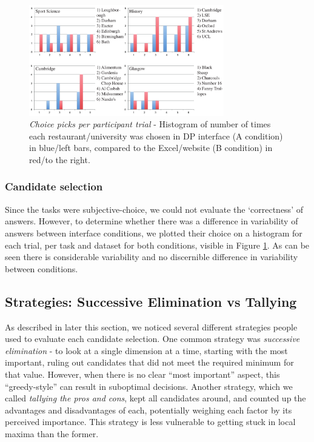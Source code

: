 \documentclass{sigchi}
\begin{document}
\begin{figure}[tbp]
\begin{center}
\includegraphics[width=8.5cm]{img/results}
\caption{\emph{Choice picks per participant trial} - Histogram of number of times each restaurant/university was chosen in DP interface (A condition) in blue/left bars, compared to the Excel/website (B condition) in red/to the right.}
\label{fig:chosen_results}
\end{center}
\end{figure}

\subsubsection{Candidate selection}
Since the tasks were subjective-choice, we could not evaluate the `correctness' of answers.  However, to determine whether there was a difference in variability of answers between interface conditions, we plotted their choice on a histogram for each trial, per task and dataset for both conditions, visible in Figure \ref{fig:chosen_results}.  As can be seen there is considerable variability and no discernible difference in variability between conditions.  

\subsection{Strategies: Successive Elimination vs Tallying}
As described in later this section, we noticed several different strategies people used to evaluate each candidate selection. One common strategy was \emph{successive elimination} - to look at a single dimension at a time, starting with the most important, ruling out candidates that did not meet the required minimum for that value.  However, when there is no clear ``most important'' aspect, this  ``greedy-style'' can result in suboptimal decisions.  Another strategy, which we called \emph{tallying the pros and cons}, kept all candidates around, and counted up the advantages and disadvantages of each, potentially weighing each factor by its perceived importance.  This strategy is less vulnerable to getting stuck in local maxima than the former.
\end{document}
